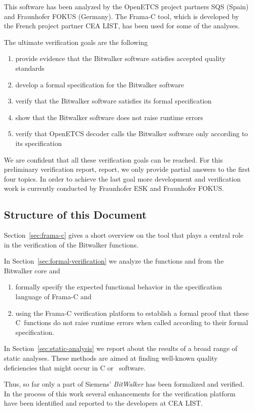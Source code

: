 This software has been analyzed by the OpenETCS project partners SQS (Spain)
and Fraunhofer FOKUS (Germany).
The Frama-C tool, which is developed by the French project partner {CEA LIST},
has been used for some of the analyses.

\clearpage

The ultimate verification goals are the following

\begin{enumerate}
\item provide evidence that the Bitwalker software satisfies 
      accepted quality standards
\item develop a formal specification for the Bitwalker software
\item verify that the Bitwalker software satisfies its formal specification
\item show that the Bitwalker software does not raise runtime errors
\item verify that OpenETCS decoder calls the Bitwalker software only
      according to its specification
\end{enumerate}

We are confident that all these verification goals can be reached.
For this preliminary verification report, report,
we only provide partial answers to the first four topics.
In order to achieve the last goal more development and verification
work is currently conducted by Fraunhofer ESK and Fraunhofer FOKUS. 

\subsection{Structure of this Document}

Section~\ref{sec:frama-c} gives a short overview on the \framacwp tool
that plays a central role in the verification of the Bitwalker functions.

In Section~\ref{sec:formal-verification} we analyze
the functions \peek and \poke from the Bitwalker core and
\begin{enumerate}
\item formally specify the
      expected functional behavior in the \acsl specification language of {Frama-C}
      and
\item using the {Frama-C} verification platform to establish a formal proof that these
      C~functions do not raise runtime errors when called according to their
      formal specification.
\end{enumerate}

In Section~\ref{sec:static-analysis} we report about the results of a broad range
of static analyses. 
These methods are aimed at finding well-known quality deficiencies that
might occur in C or \CC\ software.

Thus, so far only a part of Siemens' \emph{BitWalker} has been formalized and verified.
In the process of this work several enhancements for the \framac verification platform
have been identified and reported to the developers at {CEA LIST}.


